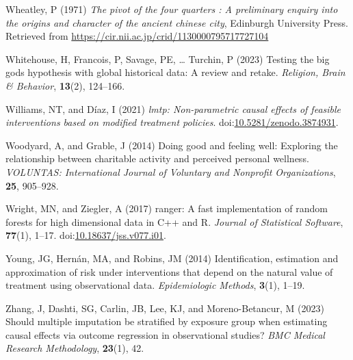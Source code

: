 \documentclass[
  single column]{article}
\newlength{\cslhangindent}
\newenvironment{CSLReferences}[2] %
 {\begin{list}{}{%
  \setlength{\itemindent}{0pt}
  \setlength{\leftmargin}{0pt}
  \setlength{\parsep}{0pt}
  \ifodd #1
   \setlength{\leftmargin}{\cslhangindent}
   \setlength{\itemindent}{-1\cslhangindent}
  \fi
  \setlength{\itemsep}{#2\baselineskip}}}
 {\end{list}}
\begin{document}
\begin{CSLReferences}{1}{0}
Wheatley, P (1971) \emph{The pivot of the four quarters : A preliminary
enquiry into the origins and character of the ancient chinese city},
Edinburgh University Press. Retrieved from
\url{https://cir.nii.ac.jp/crid/1130000795717727104}

Whitehouse, H, Francois, P, Savage, PE, \ldots{} Turchin, P (2023)
Testing the big gods hypothesis with global historical data: A review
and retake. \emph{Religion, Brain \& Behavior}, \textbf{13}(2),
124--166.

Williams, NT, and Díaz, I (2021) \emph{{l}mtp: Non-parametric causal
effects of feasible interventions based on modified treatment policies}.
doi:\href{https://doi.org/10.5281/zenodo.3874931}{10.5281/zenodo.3874931}.

Woodyard, A, and Grable, J (2014) Doing good and feeling well: Exploring
the relationship between charitable activity and perceived personal
wellness. \emph{VOLUNTAS: International Journal of Voluntary and
Nonprofit Organizations}, \textbf{25}, 905--928.

Wright, MN, and Ziegler, A (2017) {ranger}: A fast implementation of
random forests for high dimensional data in {C++} and {R}. \emph{Journal
of Statistical Software}, \textbf{77}(1), 1--17.
doi:\href{https://doi.org/10.18637/jss.v077.i01}{10.18637/jss.v077.i01}.

Young, JG, Hernán, MA, and Robins, JM (2014) Identification, estimation
and approximation of risk under interventions that depend on the natural
value of treatment using observational data. \emph{Epidemiologic
Methods}, \textbf{3}(1), 1--19.

Zhang, J, Dashti, SG, Carlin, JB, Lee, KJ, and Moreno-Betancur, M (2023)
Should multiple imputation be stratified by exposure group when
estimating causal effects via outcome regression in observational
studies? \emph{BMC Medical Research Methodology}, \textbf{23}(1), 42.

\end{CSLReferences}
\end{document}
